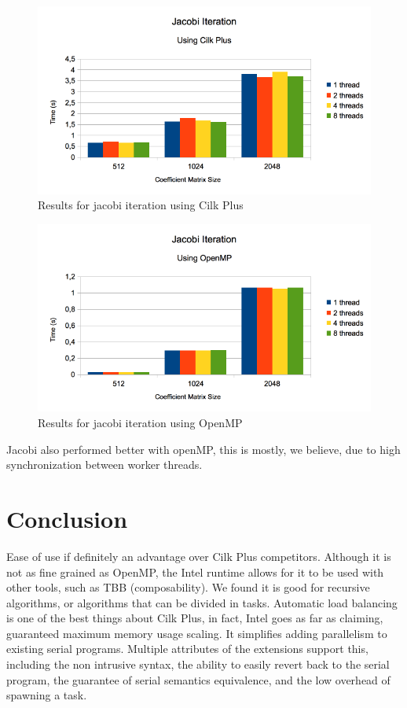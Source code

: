 \documentclass[a4paper,10pt,openright,openbib,twocolumn]{article}
\begin{document}
        \begin{figure}[H]
            \centering
            \includegraphics[scale=0.45]{images/jacobicilk.png}
            \caption{Results for jacobi iteration using Cilk Plus}
            \label{roofline}
        \end{figure}
        \begin{figure}[H]
            \centering
            \includegraphics[scale=0.45]{images/jacobiopenmp.png}
            \caption{Results for jacobi iteration using OpenMP}
            \label{roofline}
        \end{figure}
        Jacobi also performed better with openMP, this is mostly, we believe, due to high synchronization between worker threads. \\

\section{Conclusion} \label{conc}

Ease of use if definitely an advantage over Cilk Plus competitors. Although it is not as fine grained as OpenMP, the Intel runtime allows for it to be used with other tools, such as TBB (composability). We found it is good for recursive algorithms, or algorithms that can be divided in tasks. Automatic load balancing is one of the best things about Cilk Plus, in fact, Intel goes as far as claiming, guaranteed maximum memory usage scaling. It simplifies adding parallelism to existing serial programs. Multiple attributes of the extensions support this, including the non intrusive syntax, the ability to easily revert back to the serial program, the guarantee of serial semantics equivalence, and the low overhead of spawning a task.
\end{document}
